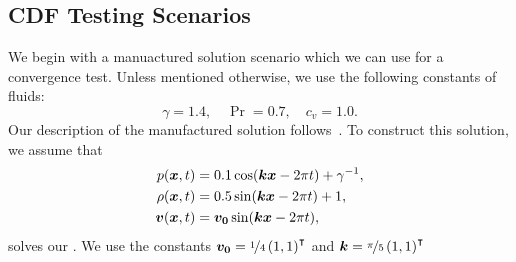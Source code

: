 \documentclass[runningheads]{llncs}
\begin{document}
\subsection{CDF Testing Scenarios}
We begin with a manuactured solution scenario which we can use for a convergence test.
Unless mentioned otherwise, we use the following constants of fluids:
\begin{equation}
  \gamma = 1.4, \quad \Pr = 0.7, \quad c_v = 1.0.
\end{equation}
Our description of the manufactured solution follows~\cite{dumbser2010arbitrary}.
To construct this solution, we assume that
\begin{align}\label{eq:manufactured-solution}
  \begin{split}
    p(\bm{x}, t) &= 0.1 \cos( \bm{k} \bm{x} - 2 \pi t ) + \gamma^{-1}, \\
    \rho(\bm{x}, t) &= 0.5 \sin (\bm{k} \bm{x} - 2 \pi t) + 1, \\
    \bm{v}(\bm{x}, t) &= \bm{v_0} \sin(\bm{k} \bm{x} - 2 \pi t),
  \end{split}
  \end{align}
solves our \pde{}.
We use the constants $\bm{v_0} = \nicefrac{1}{4} \left( 1, 1 \right)^\intercal$ and $\bm{k} = \nicefrac{\pi}{5} \left( 1, 1 \right)^\intercal$ 
\end{document}
